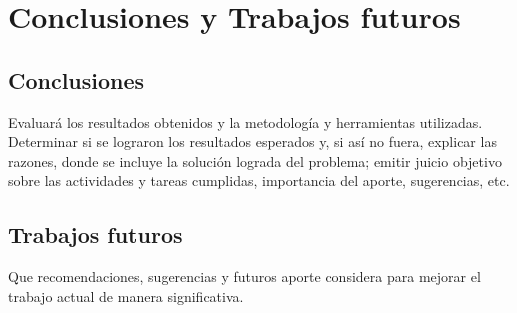 \chapter{Conclusiones y Trabajos futuros}

\section{Conclusiones}

Evaluar\'a los resultados obtenidos y la metodolog\'ia y herramientas utilizadas. Determinar si se lograron los resultados esperados y, si as\'i no fuera, explicar las razones, donde se incluye la soluci\'on lograda del problema; emitir juicio objetivo sobre las actividades y tareas cumplidas, importancia del aporte, sugerencias, etc.

\section{Trabajos futuros}

Que recomendaciones, sugerencias y futuros aporte considera para mejorar el trabajo actual de manera significativa.